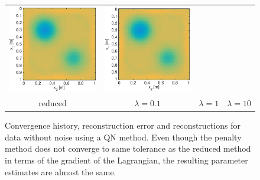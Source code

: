 \documentclass{iopart}
\begin{document}
\begin{figure}
\begin{tabular}{cccc}
\includegraphics[scale=.2]{./figs/2D_exp2_h}&
\includegraphics[scale=.2]{./figs/2D_exp2_i}\\
{\small reduced}&{\small $\lambda=0.1$}&{\small $\lambda=1$}&{\small $\lambda=10$}\\
\end{tabular}
\caption{Convergence history, reconstruction error and reconstructions for data without noise using a QN method. Even though the penalty method does not converge to same tolerance as the reduced method in terms of the gradient of the Lagrangian, the resulting parameter estimates are almost the same.}
\label{fig:2D_exp2}
\end{figure}
\end{document}
